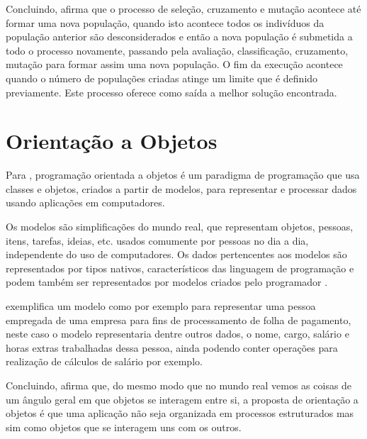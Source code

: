 \par Concluindo,  afirma que o processo de 
seleção, cruzamento e mutação acontece até formar uma nova população, 
quando isto acontece todos os indivíduos da população anterior são
desconsiderados e então a nova população é submetida a todo o processo
novamente, passando pela avaliação, classificação, cruzamento, mutação para
formar assim uma nova população. O fim da execução acontece quando o
número de populações criadas atinge um limite que é definido previamente.
Este processo oferece como saída a melhor solução encontrada.


\section{Orientação a Objetos}

\par Para ,
programação orientada a objetos é um paradigma de programação que usa
classes e objetos, criados a partir de modelos, para representar e processar
dados usando aplicações em computadores.

\par Os modelos são simplificações do mundo real, que representam
objetos, pessoas, itens, tarefas, ideias, etc. usados comumente por
pessoas no dia a dia, independente do uso de computadores. 
Os dados pertencentes aos modelos são representados por tipos nativos,
característicos das linguagem de programação e podem também ser representados
por modelos criados pelo
programador \cite{livro_intro_a_prog_orientada_objetos_usando_java}.

\par {}
exemplifica um modelo como por exemplo para representar uma pessoa empregada de
uma empresa para fins de processamento de folha de pagamento, neste caso o
modelo representaria dentre outros dados, o nome, cargo, salário e horas extras
trabalhadas dessa pessoa, ainda podendo conter operações para realização
de cálculos de salário por exemplo.


\par Concluindo,  afirma que, do mesmo modo 
que no mundo real vemos as coisas de um ângulo geral em que objetos se
interagem entre si, a proposta de orientação a objetos é que uma  
aplicação não seja organizada em processos estruturados mas
sim como objetos que se interagem uns com os outros.



